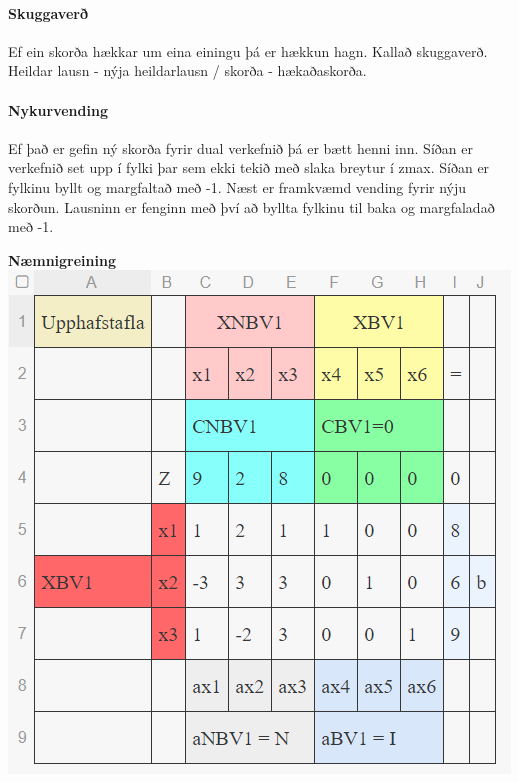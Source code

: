 \documentclass[]{article}
\begin{document}
\begin{multicols}{2}
\paragraph{Skuggaverð} Ef ein skorða hækkar um eina einingu þá er hækkun hagn. Kallað skuggaverð. Heildar lausn - nýja heildarlausn / skorða - hækaðaskorða.
\paragraph{Nykurvending}
Ef það er gefin ný skorða fyrir dual verkefnið þá er bætt henni inn. Síðan er verkefnið set upp í fylki þar sem ekki tekið með slaka breytur í zmax. Síðan er fylkinu byllt og margfaltað með -1. Næst er framkvæmd vending fyrir nýju skorðun. Lausninn er fenginn með því að byllta fylkinu til baka og margfaladað með -1. 



\columnbreak
\textbf{Næmnigreining} \\
\includegraphics[scale=0.8]{upp}

\end{multicols}
\end{document}
